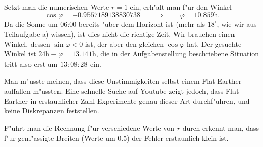 \begin{loesung}
\begin{teilaufgaben}
Setzt man die numerischen Werte $r=1$ ein, erh"alt man f"ur
den Winkel
\[
\cos\varphi= -0.9557189138830738
\qquad\Rightarrow\qquad
\varphi = 10.859\text{h}.
\]
Da die Sonne um 06:00 bereits "uber dem Horizont ist (mehr als $18^\circ$,
wie wir aus Teilaufgabe a) wissen), ist dies nicht die richtige Zeit.
Wir brauchen einen Winkel, dessen $\sin\varphi<0$ ist, der aber
den gleichen $\cos\varphi$ hat.
Der gesuchte Winkel ist $24\text{h}-\varphi=13.141\text{h}$, die
in der Aufgabenstellung beschriebene Situation tritt also erst um
$13:08:28$ ein. 
\end{teilaufgaben}
Man m"usste meinen, dass diese Unstimmigkeiten selbst einem Flat Earther 
auffallen m"ussten.
Eine schnelle Suche auf Youtube zeigt jedoch, dass Flat Earther in
erstaunlicher Zahl Experimente genau dieser Art durchf"uhren, und keine
Diskrepanzen feststellen.

F"uhrt man die Rechnung f"ur verschiedene Werte von $r$ durch erkennt man,
dass f"ur gem"assigte Breiten (Werte um 0.5) der Fehler erstaunlich klein
ist.
\end{loesung}


\begin{bewertung}
\end{bewertung}

